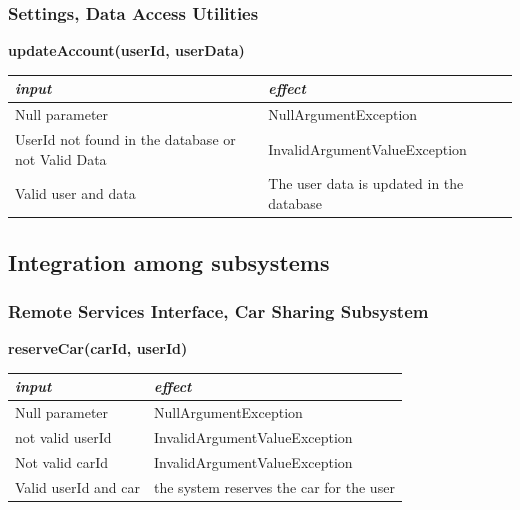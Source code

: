 \documentclass{article}
\begin{document}
\begin{flushleft}
       
       
        \subsubsection{Settings, Data Access Utilities}
          \begin{center}
   \begin {flushleft}
    \textbf{updateAccount(userId, userData)}
    \end{flushleft}
        \begin{tabular}{  |  p{6cm} | p{6cm} |}
    \hline
    \textit{input} &  \textit{effect} \\
    \hline
    
    Null parameter & NullArgumentException
     \\ 
  \hline
  UserId not found in the database or not Valid Data &  InvalidArgumentValueException   \\
  \hline
 Valid user and data &   The user data is updated in the database
 \\
  \hline
    \end{tabular}
\end{center}
    
    
    
        
     \subsection{Integration among subsystems} %
     
     
     
      \subsubsection{Remote Services Interface, Car Sharing Subsystem}
      
      
      
         \begin{center}
   \begin{flushleft}
    \textbf{reserveCar(carId, userId)}
    \end{flushleft}
        \begin{tabular}{  |  p{6cm} | p{6cm} |}
    \hline
    \textit{input} &  \textit{effect} \\
    \hline
    
    Null parameter & NullArgumentException
     \\ 
  \hline
   not valid  userId & InvalidArgumentValueException  \\
  \hline
   Not valid  carId & InvalidArgumentValueException  \\
  \hline
  Valid userId and  car & the system reserves the car for the user  \\
  \hline
    \end{tabular}
\end{center}



\end{flushleft}
\end{document}
